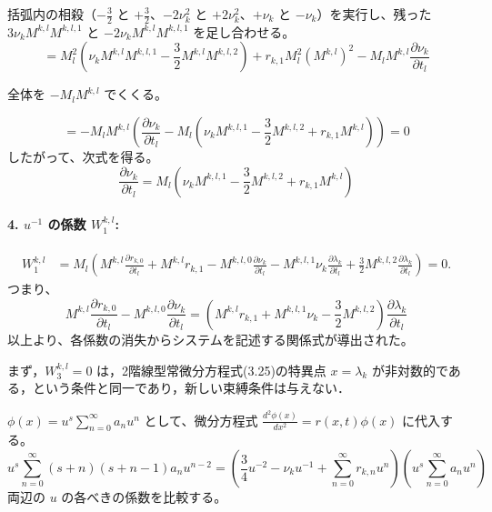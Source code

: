 括弧内の相殺（$-\frac{3}{2}$ と $+\frac{3}{2}$、$-2\nu_k^2$ と $+2\nu_k^2$、$+\nu_k$ と $-\nu_k$）を実行し、残った $3\nu_k M^{k,l} M^{k,l,1}$ と $-2\nu_k M^{k,l} M^{k,l,1}$ を足し合わせる。
\begin{equation}
= M_l^2 \left( \nu_k M^{k,l} M^{k,l,1} - \frac{3}{2} M^{k,l} M^{k,l,2} \right) + r_{k,1} M_l^2 (M^{k,l})^2 - M_l M^{k,l} \frac{\partial \nu_k}{\partial t_l}
\end{equation}

全体を $-M_l M^{k,l}$ でくくる。

\begin{equation}
= - M_l M^{k,l} \left( \frac{\partial \nu_k}{\partial t_l} - M_l \left( \nu_k M^{k,l,1} - \frac{3}{2} M^{k,l,2} + r_{k,1} M^{k,l} \right) \right) = 0
\end{equation}
したがって、次式を得る。
\begin{equation}
\frac{\partial \nu_k}{\partial t_l} = M_l \left( \nu_k M^{k,l,1} - \frac{3}{2} M^{k,l,2} + r_{k,1} M^{k,l} \right)
\end{equation}

\paragraph{4. $u^{-1}$ の係数 $W_1^{k,l}$:}
\begin{align*}
    W_1^{k,l} &= M_l \left( M^{k,l} \frac{\partial r_{k,0}}{\partial t_l} + M^{k,l} r_{k,1} - M^{k,l,0} \frac{\partial \nu_k}{\partial t_l} - M^{k,l,1} \nu_k \frac{\partial \lambda_k}{\partial t_l} + \frac{3}{2} M^{k,l,2} \frac{\partial \lambda_k}{\partial t_l} \right) = 0.
\end{align*}
つまり、
\begin{equation*}
M^{k,l} \frac{\partial r_{k,0}}{\partial t_l} - M^{k,l,0} \frac{\partial \nu_k}{\partial t_l} = \left(M^{k,l} r_{k,1} + M^{k,l,1} \nu_k  - \frac{3}{2} M^{k,l,2}\right) \frac{\partial \lambda_k}{\partial t_l}
\end{equation*}
以上より、各係数の消失からシステムを記述する関係式が導出された。

\begin{story}
まず，$W_3^{k,l}=0$ は，2階線型常微分方程式(3.25)の特異点 $x=\lambda_k$ が非対数的である，という条件と同一であり，新しい束縛条件は与えない．
\end{story}
$\phi(x) = u^s \sum_{n=0}^\infty a_n u^n$ として、微分方程式 $\frac{d^2\phi(x)}{dx^2} = r(x,t)\phi(x)$ に代入する。
\begin{equation*}
    u^s \sum_{n=0}^\infty (s+n)(s+n-1) a_n u^{n-2} = \left( \frac{3}{4} u^{-2} - \nu_k u^{-1} + \sum_{n=0}^\infty r_{k,n} u^n \right) \left( u^s \sum_{n=0}^\infty a_n u^n \right)
\end{equation*}
両辺の $u$ の各べきの係数を比較する。

